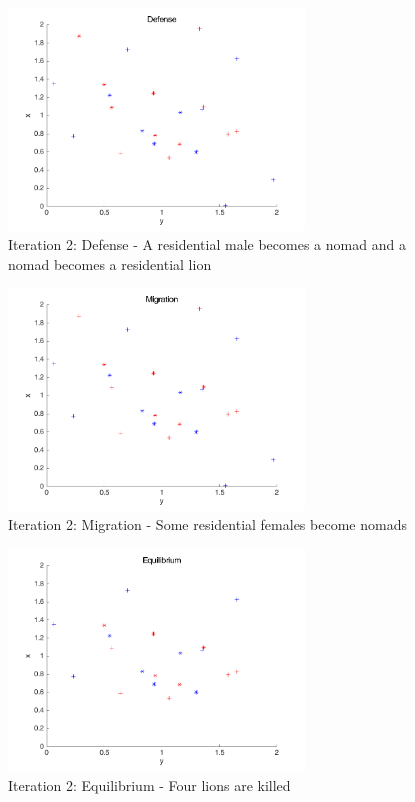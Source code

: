 \begin{figure}[H]
\begin{center}
\includegraphics[width=0.7\textwidth]{img/mdme/defense2}
\caption{Iteration 2: Defense - A residential male becomes a nomad and a nomad becomes a residential lion}
\end{center}
\end{figure}

\begin{figure}[H]
\begin{center}
\includegraphics[width=0.7\textwidth]{img/mdme/migration2}
\caption{Iteration 2: Migration - Some residential females become nomads}
\end{center}
\end{figure}

\begin{figure}[H]
\begin{center}
\includegraphics[width=0.7\textwidth]{img/mdme/equilibrium2}
\caption{Iteration 2: Equilibrium - Four lions are killed}
\end{center}
\end{figure}

